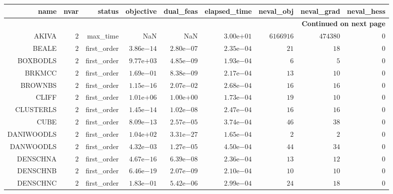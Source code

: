 \begin{longtable}{rrrrrrrrr}
\hline
name & nvar & status & objective & dual\_feas & elapsed\_time & neval\_obj & neval\_grad & neval\_hess \\\hline
\endhead
\hline
\multicolumn{9}{r}{{\bfseries Continued on next page}}\\
\hline
\endfoot
\endlastfoot
AKIVA & \(     2\) & max\_time &       NaN &       NaN & \( 3.00\)e\(+01\) & \(6166916\) & \(474380\) & \(     0\) \\
BEALE & \(     2\) & first\_order & \( 3.86\)e\(-14\) & \( 2.80\)e\(-07\) & \( 2.35\)e\(-04\) & \(    21\) & \(    18\) & \(     0\) \\
BOXBODLS & \(     2\) & first\_order & \( 9.77\)e\(+03\) & \( 4.85\)e\(-09\) & \( 1.93\)e\(-04\) & \(     6\) & \(     5\) & \(     0\) \\
BRKMCC & \(     2\) & first\_order & \( 1.69\)e\(-01\) & \( 8.38\)e\(-09\) & \( 2.17\)e\(-04\) & \(    13\) & \(    10\) & \(     0\) \\
BROWNBS & \(     2\) & first\_order & \( 1.15\)e\(-16\) & \( 2.07\)e\(-02\) & \( 2.68\)e\(-04\) & \(    16\) & \(    16\) & \(     0\) \\
CLIFF & \(     2\) & first\_order & \( 1.01\)e\(+06\) & \( 1.00\)e\(+00\) & \( 1.73\)e\(-04\) & \(    19\) & \(    10\) & \(     0\) \\
CLUSTERLS & \(     2\) & first\_order & \( 1.45\)e\(-14\) & \( 1.02\)e\(-08\) & \( 2.47\)e\(-04\) & \(    16\) & \(    16\) & \(     0\) \\
CUBE & \(     2\) & first\_order & \( 8.09\)e\(-13\) & \( 2.57\)e\(-05\) & \( 3.74\)e\(-04\) & \(    46\) & \(    38\) & \(     0\) \\
DANIWOODLS & \(     2\) & first\_order & \( 1.04\)e\(+02\) & \( 3.31\)e\(-27\) & \( 1.65\)e\(-04\) & \(     2\) & \(     2\) & \(     0\) \\
DANWOODLS & \(     2\) & first\_order & \( 4.32\)e\(-03\) & \( 1.27\)e\(-05\) & \( 4.50\)e\(-04\) & \(    44\) & \(    34\) & \(     0\) \\
DENSCHNA & \(     2\) & first\_order & \( 4.67\)e\(-16\) & \( 6.39\)e\(-08\) & \( 2.36\)e\(-04\) & \(    13\) & \(    12\) & \(     0\) \\
DENSCHNB & \(     2\) & first\_order & \( 6.46\)e\(-19\) & \( 2.07\)e\(-09\) & \( 2.10\)e\(-04\) & \(    10\) & \(    10\) & \(     0\) \\
DENSCHNC & \(     2\) & first\_order & \( 1.83\)e\(-01\) & \( 5.42\)e\(-06\) & \( 2.99\)e\(-04\) & \(    24\) & \(    18\) & \(     0\) \\

\end{longtable}

